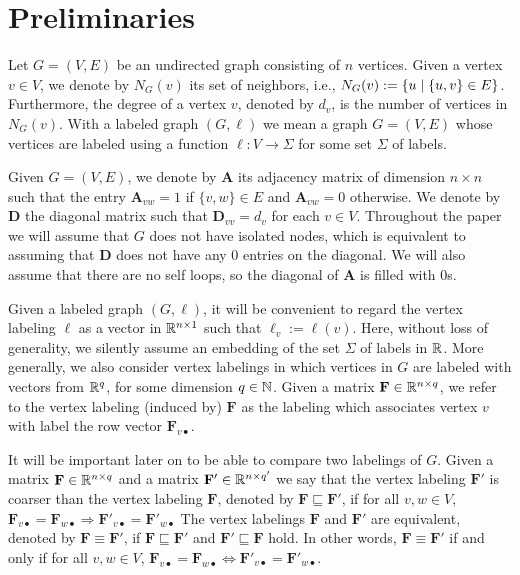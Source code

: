 \section{Preliminaries}
Let $G=(V,E)$ be an undirected graph consisting of $n$ vertices.
Given a vertex $v\in V$, we denote by $N_G(v)$ its set of neighbors, i.e., $N_G(v):=\{u\mathrel{\mid} \{u,v\}\in E\}$. Furthermore, the degree of a vertex $v$, denoted by $d_{v}$, is the number of vertices in $N_G(v)$. With a labeled graph $(G,\pmb{\ell})$ we mean a graph $G=(V,E)$ whose vertices are labeled using a function $\pmb{\ell}:V\to \Sigma$
for some set $\Sigma$ of labels.

Given $G=(V,E)$, we denote by $\mathbf{A}$ its adjacency matrix of dimension $n \times n$ such that the entry $\mathbf{A}_{vw}=1$ if $\{v,w\}\in E$ and  $\mathbf{A}_{vw}=0$ otherwise. We denote by $\mathbf{D}$ the diagonal matrix such that $\mathbf{D}_{vv}=d_v$ for each $v\in V$. Throughout the paper we will assume that $G$ does not have isolated nodes, which is equivalent to assuming that $\mathbf{D}$ does not have any $0$ entries on the diagonal. We will also assume that there are no self loops, so the diagonal of $\mathbf{A}$ is filled with $0$s.

Given a labeled graph $(G,\pmb{\ell})$, it will be convenient to regard the vertex labeling $\pmb{\ell}$ as a vector in $\mathbb{R}^{n\times 1}$ such that $\pmb{\ell}_v:=\pmb{\ell}(v)$. Here, without loss of generality, we silently assume an embedding of  the set $\Sigma$ of labels in $\mathbb{R}$. More generally, we also consider vertex labelings in which 
vertices in $G$ are labeled  with vectors from $\mathbb{R}^q$, for some dimension $q \in \mathbb{N}$. 
Given a matrix $\mathbf{F} \in \mathbb{R}^{n \times q}$, we refer to the vertex labeling (induced by)
$\mathbf{F}$ as the labeling which associates vertex $v$ with label the row vector  $\mathbf{F}_{v\bullet}$.

It will be important later on to be able to compare two labelings of $G$.
Given a matrix $\mathbf{F} \in \mathbb{R}^{n\times q}$ and a matrix $\mathbf{F}' \in \mathbb{R}^{n\times q'}$ we say that the
vertex labeling  $\mathbf{F}'$ is coarser than the vertex labeling $\mathbf{F}$, denoted by $\mathbf{F}\sqsubseteq \mathbf{F}'$, if
for all $v,w\in V$,
$
\mathbf{F}_{v\bullet}=\mathbf{F}_{w\bullet} \Rightarrow \mathbf{F}'_{v\bullet}=\mathbf{F}'_{w\bullet}
$
The vertex labelings $\mathbf{F}$ and $\mathbf{F}'$ are equivalent, denoted by $\mathbf{F}\equiv\mathbf{F}'$, if $\mathbf{F}\sqsubseteq \mathbf{F}'$ and
$\mathbf{F}'\sqsubseteq \mathbf{F}$ hold. In other words, $\mathbf{F}\equiv\mathbf{F}'$ if and only if for all $v,w\in V$,
$
\mathbf{F}_{v\bullet}=\mathbf{F}_{w\bullet} \Leftrightarrow \mathbf{F}'_{v\bullet}=\mathbf{F}'_{w\bullet}
$.

